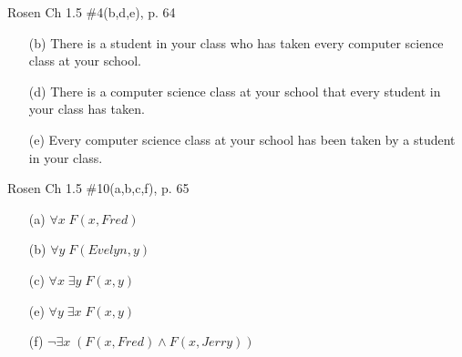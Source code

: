 \begin{questions}
 Rosen Ch 1.5 \#4(b,d,e), p. 64
    \ifprintanswers
        \vspace{-12pt}
    \fi
  \begin{solution}
      \begin{itemize}[itemsep=0pt,parsep=0pt,topsep=0pt,partopsep=0pt]
         \item[(b)] There is a student in your class who has taken every computer science class at your school.
          \item[(d)] There is a computer science class at your school that every student in your class has taken.
          \item[(e)] Every computer science class at your school has been taken by a student in your class.
      \end{itemize}
  \end{solution}


 Rosen Ch 1.5 \#10(a,b,c,f), p. 65
    \ifprintanswers
        \vspace{-12pt}
    \fi
  \begin{solution}
      \begin{itemize}[itemsep=0pt,parsep=0pt,topsep=0pt,partopsep=0pt]
         \item[(a)] $\forall x\; F(x,Fred)$
         \item[(b)] $\forall y\; F(Evelyn, y)$
          \item[(c)] $\forall x\; \exists y\; F(x,y)$
         \item[(e)] $ \forall y\; \exists x\; F(x,y)$
          \item[(f)] $\neg \exists x\; (F(x, Fred) \wedge F(x,Jerry))$
      \end{itemize}
  \end{solution}



\end{questions}
